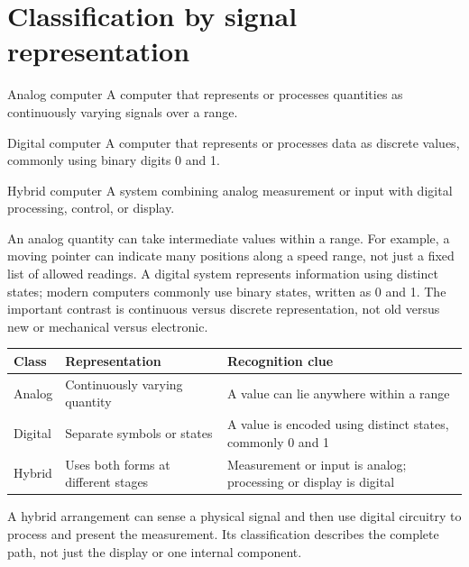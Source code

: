 \section{Classification by signal representation}
\begin{definitionbox}{Analog computer}
A computer that represents or processes quantities as continuously varying
signals over a range.
\end{definitionbox}

\begin{definitionbox}{Digital computer}
A computer that represents or processes data as discrete values, commonly
using binary digits 0 and 1.
\end{definitionbox}

\begin{definitionbox}{Hybrid computer}
A system combining analog measurement or input with digital processing,
control, or display.
\end{definitionbox}

An analog quantity can take intermediate values within a range. For
example, a moving pointer can indicate many positions along a speed range,
not just a fixed list of allowed readings. A digital system represents
information using distinct states; modern computers commonly use binary
states, written as 0 and 1. The important contrast is continuous versus
discrete representation, not old versus new or mechanical versus electronic.

\begin{center}
\begin{tabular}{p{}p{}p{}}
\toprule
\textbf{Class} & \textbf{Representation} & \textbf{Recognition clue}\\
\midrule
Analog & Continuously varying quantity & A value can lie anywhere within a range\\
Digital & Separate symbols or states & A value is encoded using distinct states, commonly 0 and 1\\
Hybrid & Uses both forms at different stages & Measurement or input is analog; processing or display is digital\\
\bottomrule
\end{tabular}
\end{center}

A hybrid arrangement can sense a physical signal and then use digital
circuitry to process and present the measurement. Its classification
describes the complete path, not just the display or one internal component.

